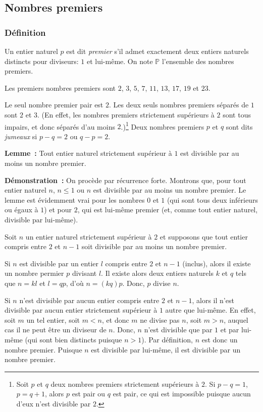 \subsection{Nombres premiers}

\subsubsection{Définition}
\label{subsub:defNombresPremiers}

Un entier naturel $p$ est dit \textit{premier} s'il admet exactement deux entiers naturels distincts pour diviseurs: $1$ et lui-même.
On note $\mathbb{P}$ l'ensemble des nombres premiers.

Les premiers nombres premiers sont $2$, $3$, $5$, $7$, $11$, $13$, $17$, $19$ et $23$.

Le seul nombre premier pair est $2$. 
Les deux seuls nombres premiers séparés de $1$ sont $2$ et $3$. 
(En effet, les nombres premiers strictement supérieurs à $2$ sont tous impairs, et donc séparés d'au moins $2$.)\footnote{Soit $p$ et $q$ deux nombres premiers strictement supérieurs à $2$. Si $p-q=1$, $p=q+1$, alors $p$ est pair ou $q$ est pair, ce qui est impossible puisque aucun d'eux n'est divisible par $2$.}
Deux nombres premiers $p$ et $q$ sont dits \textit{jumeaux} si $p-q=2$ ou $q-p=2$. 

\bigskip

\noindent\textbf{Lemme :} Tout entier naturel strictement supérieur à $1$ est divisible par au moins un nombre premier.

\medskip

\noindent\textbf{Démonstration :} On procède par récurrence forte. 
Montrons que, pour tout entier naturel $n$, $n \leq 1$ ou $n$ est divisible par au moins un nombre premier.
Le lemme est évidemment vrai pour les nombres $0$ et $1$ (qui sont tous deux inférieurs ou égaux à $1$) et pour $2$, qui est lui-même premier (et, comme tout entier naturel, divisible par lui-même). 

Soit $n$ un entier naturel strictement supérieur à $2$ et supposons que tout entier compris entre $2$ et $n-1$ soit divisible par au moins un nombre premier. 

Si $n$ est divisible par un entier $l$ compris entre $2$ et $n-1$ (inclus), alors il existe un nombre permier $p$ divisant $l$. 
Il existe alors deux entiers naturels $k$ et $q$ tels que $n = k l$ et $l = q p$, d'où $n = (k q) p$. 
Donc, $p$ divise $n$. 

Si $n$ n'est divisible par aucun entier compris entre $2$ et $n-1$, alors il n'est divisible par aucun entier strictement supérieur à $1$ autre que lui-même. 
En effet, soit $m$ un tel entier, soit $m < n$, et donc $m$ ne divise pas $n$, soit $m > n$, auquel cas il ne peut être un diviseur de $n$.
Donc, $n$ n'est divisible que par $1$ et par lui-même (qui sont bien distincts puisque $n > 1$). 
Par définition, $n$ est donc un nombre premier. 
Puisque $n$ est divisible par lui-même, il est divisible par un nombre premier. 

